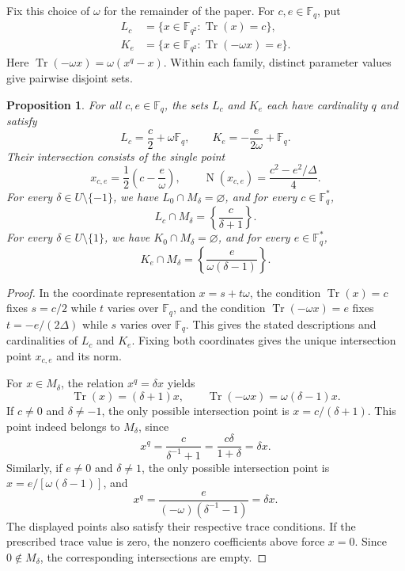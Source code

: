 \documentclass[preprint,12pt,a4paper]{elsarticle}
\newtheorem{proposition}[theorem]{Proposition}
\newcommand{\Tr}{\operatorname{Tr}}
\newcommand{\N}{\operatorname{N}}
\begin{document}
Fix this choice of $\omega$ for the remainder of the paper. For $c,e\in\mathbb F_q$, put
\[
\begin{aligned}
 L_c&=\{x\in\mathbb F_{q^2}:\Tr(x)=c\},\\
 K_e&=\{x\in\mathbb F_{q^2}:\Tr(-\omega x)=e\}.
\end{aligned}
\]
Here $\Tr(-\omega x)=\omega(x^q-x)$. Within each family, distinct parameter values give pairwise disjoint sets.

\begin{proposition}\label{prop:intersection-formulas}
For all $c,e\in\mathbb F_q$, the sets $L_c$ and $K_e$ each have cardinality $q$ and satisfy
\[
 L_c=\frac c2+\omega\mathbb F_q,\qquad
 K_e=-\frac{e}{2\omega}+\mathbb F_q.
\]
Their intersection consists of the single point
\[
 x_{c,e}=\frac12\left(c-\frac e\omega\right),
 \qquad \N(x_{c,e})=\frac{c^2-e^2/\Delta}{4}.
\]
For every $\delta\in U\setminus\{-1\}$, we have $L_0\cap M_\delta=\varnothing$, and for every $c\in\mathbb F_q^{*}$,
\[
 L_c\cap M_\delta=\left\{\frac{c}{\delta+1}\right\}.
\]
For every $\delta\in U\setminus\{1\}$, we have $K_0\cap M_\delta=\varnothing$, and for every $e\in\mathbb F_q^{*}$,
\[
 K_e\cap M_\delta=\left\{\frac{e}{\omega(\delta-1)}\right\}.
\]
\end{proposition}

\begin{proof}
In the coordinate representation $x=s+t\omega$, the condition $\Tr(x)=c$ fixes $s=c/2$ while $t$ varies over $\mathbb F_q$, and the condition $\Tr(-\omega x)=e$ fixes $t=-e/(2\Delta)$ while $s$ varies over $\mathbb F_q$. This gives the stated descriptions and cardinalities of $L_c$ and $K_e$. Fixing both coordinates gives the unique intersection point $x_{c,e}$ and its norm.

For $x\in M_\delta$, the relation $x^q=\delta x$ yields
\[
 \Tr(x)=(\delta+1)x,\qquad
 \Tr(-\omega x)=\omega(\delta-1)x.
\]
If $c\ne0$ and $\delta\ne-1$, the only possible intersection point is $x=c/(\delta+1)$. This point indeed belongs to $M_\delta$, since
\[
 x^q=\frac{c}{\delta^{-1}+1}=\frac{c\delta}{1+\delta}=\delta x.
\]
Similarly, if $e\ne0$ and $\delta\ne1$, the only possible intersection point is $x=e/[\omega(\delta-1)]$, and
\[
 x^q=\frac{e}{(-\omega)(\delta^{-1}-1)}=\delta x.
\]
The displayed points also satisfy their respective trace conditions. If the prescribed trace value is zero, the nonzero coefficients above force $x=0$. Since $0\notin M_\delta$, the corresponding intersections are empty.
\end{proof}
\end{document}
